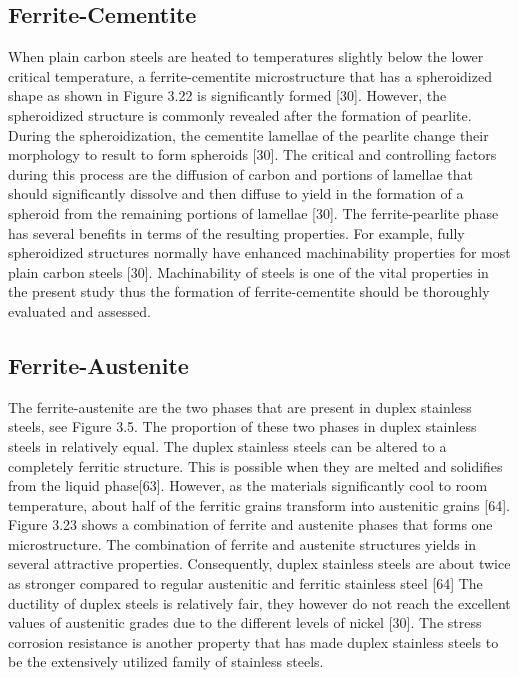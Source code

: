 \documentclass[12pt]{report}
\begin{document}
\subsection{Ferrite-Cementite}
When plain carbon steels are heated to temperatures slightly below the lower critical temperature, a ferrite-cementite microstructure that has a spheroidized shape as shown in Figure 3.22 is significantly formed [30]. However, the spheroidized structure is commonly revealed after the formation of pearlite. During the spheroidization, the cementite lamellae of the pearlite change their morphology to result to form spheroids [30].
The critical and controlling factors during this process are the diffusion of carbon and portions of lamellae that should significantly dissolve and then diffuse to yield in the formation of a spheroid from the remaining portions of lamellae [30]. The ferrite-pearlite phase has several benefits in terms of the resulting properties. For example, fully spheroidized structures normally have enhanced machinability properties for most plain carbon steels [30].  Machinability of steels is one of the vital properties in the present study thus the formation of ferrite-cementite should be thoroughly evaluated and assessed.


\subsection{Ferrite-Austenite}
The ferrite-austenite are the two phases that are present in duplex stainless steels, see Figure 3.5. The proportion of these two phases in duplex stainless steels in relatively equal. The duplex stainless steels can be altered to a completely ferritic structure. This is possible when they are melted and solidifies from the liquid phase[63].  However, as the materials significantly cool to room temperature, about half of the ferritic grains transform into austenitic grains [64]. Figure 3.23 shows a combination of ferrite and austenite phases that forms one microstructure.
The combination of ferrite and austenite structures yields in several attractive properties. Consequently, duplex stainless steels are about twice as stronger compared to regular austenitic and ferritic stainless steel [64] The ductility of duplex steels is relatively fair, they however do not reach the excellent values of austenitic grades due to the different levels of nickel [30]. The stress corrosion resistance is another property that has made duplex stainless steels to be the extensively utilized family of stainless steels.
 
\end{document}
